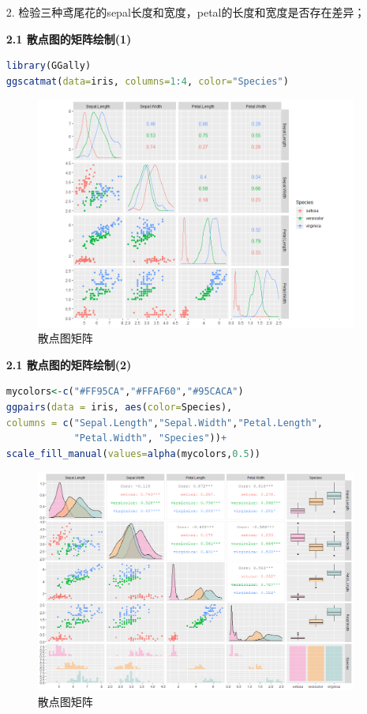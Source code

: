 \documentclass[11pt,a4paper]{ctexart}
\begin{document}
\begin{enumerate}
\hspace*{\fill}
\item[2.]检验三种鸢尾花的sepal长度和宽度，petal的长度和宽度是否存在差异；

\textbf{2.1 散点图的矩阵绘制(1)}
\begin{lstlisting}[language=r]
library(GGally)
ggscatmat(data=iris, columns=1:4, color="Species")
\end{lstlisting}
\begin{figure}[H]
	\centering
	\includegraphics[width=17cm]{1.png}  
	\caption{散点图矩阵}
\end{figure}

\textbf{2.1 散点图的矩阵绘制(2)}
\begin{lstlisting}[language=r]
mycolors<-c("#FF95CA","#FFAF60","#95CACA")
ggpairs(data = iris, aes(color=Species),
columns = c("Sepal.Length","Sepal.Width","Petal.Length",
            "Petal.Width", "Species"))+
scale_fill_manual(values=alpha(mycolors,0.5))
\end{lstlisting}
\begin{figure}[H]
	\centering
	\includegraphics[width=17cm]{2.png}  
	\caption{散点图矩阵}
\end{figure}


\end{enumerate}
\end{document}

